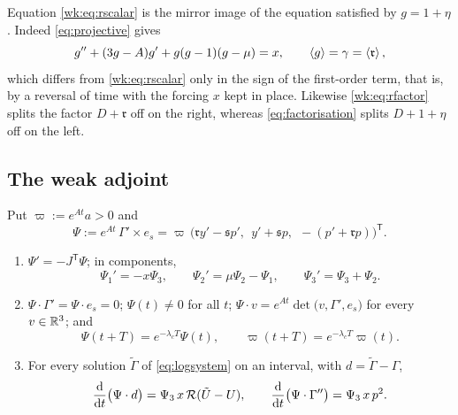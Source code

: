 Equation \eqref{wk:eq:rscalar} is the mirror image of the equation satisfied by $g=1+\eta$. Indeed \eqref{eq:projective} gives
\[
g''+(3g-A)g'+g(g-1)(g-\mu)=x,\qquad \left\langle g\right\rangle=\gamma=\left\langle \mathfrak r\right\rangle ,
\]
which differs from \eqref{wk:eq:rscalar} only in the sign of the first-order term, that is, by a reversal of time with the forcing $x$ kept in place. Likewise \eqref{wk:eq:rfactor} splits the factor $D+\mathfrak r$ off on the right, whereas \eqref{eq:factorisation} splits $D+1+\eta$ off on the left.

\subsection{The weak adjoint}
\begin{lemma}\label{wk:lem:weakadjoint}
Put $\varpi:=e^{At}a>0$ and
\begin{equation}\label{wk:eq:psi}
\Psi:=e^{At}\,\Gamma'\times e_s=\varpi\,\bigl(\mathfrak r y'-\mathfrak s p',\ \ y'+\mathfrak s p,\ \ -(p'+\mathfrak r p)\bigr)^{\mathsf T}.
\end{equation}
\begin{enumerate}[label=\textup{(\alph*)}]
\item $\Psi'=-J^{\mathsf T}\Psi$; in components,
\begin{equation}\label{wk:eq:psicomp}
\Psi_1'=-x\Psi_3,\qquad \Psi_2'=\mu\Psi_2-\Psi_1,\qquad \Psi_3'=\Psi_3+\Psi_2 .
\end{equation}
\item $\Psi\cdot\Gamma'=\Psi\cdot e_s=0$; $\Psi(t)\ne0$ for all $t$; $\Psi\cdot v=e^{At}\det\bigl(v,\Gamma',e_s\bigr)$ for every $v\in\mathbb R^3$; and
\begin{equation}\label{wk:eq:quasi}
\Psi(t+T)=e^{-\lambda_cT}\Psi(t),\qquad \varpi(t+T)=e^{-\lambda_cT}\varpi(t).
\end{equation}
\item For every solution $\tilde\Gamma$ of \eqref{eq:logsystem} on an interval, with $d=\tilde\Gamma-\Gamma$,
\begin{equation}\label{wk:eq:chord}
\frac{\mathrm d}{\mathrm dt}\bigl(\Psi\cdot d\bigr)=\Psi_3\,x\,\mathcal R(\tilde U-U),\qquad
\frac{\mathrm d}{\mathrm dt}\bigl(\Psi\cdot\Gamma''\bigr)=\Psi_3\,x\,p^2 .
\end{equation}
\end{enumerate}
\end{lemma}
